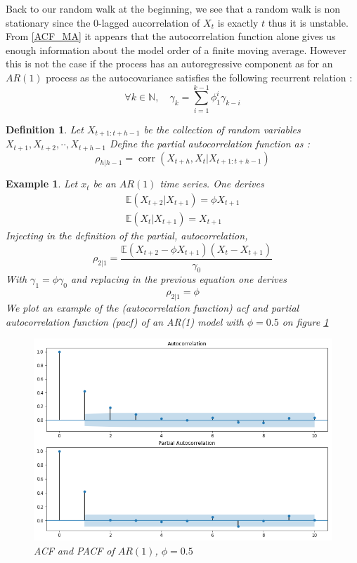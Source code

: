 \documentclass{article}
\DeclareMathOperator{\cor}{corr}
\newtheorem{ex}{Example}[section]
\newtheorem{Def}{Definition}[section]
\begin{document}
Back to our random walk at the beginning, we see that a random walk is non stationary since the 0-lagged aucorrelation of $X_t$ is exactly $t$ thus it is unstable.
From \ref{ACF_MA} it appears that the autocorrelation function alone gives us enough information about the model order of a finite moving average. However this is not the case if the process has an autoregressive component as for an $AR(1)$ process as the autocovariance satisfies the following recurrent relation : 
\begin{equation*}
    \forall k\in\mathds{N},\quad\gamma_k=\sum_{i=1}^{k-1}\phi_1^i\gamma_{k-i}
\end{equation*}
\begin{Def}
Let $X_{t+1:t+h-1}$ be the  collection of random variables $X_{t+1},X_{t+2},\cdot\cdot,X_{t+h-1}$  Define the partial autocorrelation function as :
\begin{equation*}
    \rho_{h|h-1}=\cor(X_{t+h},X_t|X_{t+1:t+h-1})
\end{equation*}
\end{Def}
\begin{ex}
Let $x_t$ be an $AR(1)$ time series. One derives \begin{align*}
    \mathbb{E}(X_{t+2}|X_{t+1})=\phi X_{t+1}\\
    \mathbb{E}(X_{t}|X_{t+1})=X_{t+1}
\end{align*}
Injecting in the definition of the partial, autocorrelation, \begin{equation*}
\rho_{2|1}=\frac{\mathbb{E}(X_{t+2}-\phi X_{t+1})(X_{t}-X_{t+1})}{\gamma_0}
\end{equation*}
With $\gamma_1=\phi\gamma_0$ and replacing in the previous equation one derives \begin{equation*}
    \rho_{2|1}=\phi
\end{equation*}
We plot an example of the (autocorrelation function) acf and partial autocorrelation function (pacf) of an AR(1) model with $\phi=0.5$ on figure \ref{fig:acf_pacf_AR1}
\begin{figure}[h]
    \includegraphics[width=\textwidth]{acf_pacf_AR1.png}
    \caption{ACF and PACF of $AR(1)$, $\phi=0.5$}
    \label{fig:acf_pacf_AR1}
\end{figure}
\end{ex}
\end{document}
